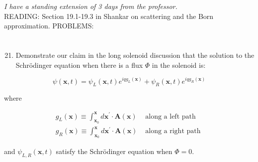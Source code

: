 \documentclass[12pt]{article}
\begin{document}
\emph{I have a standing extension of 3 days from the professor.}\\
READING: Section 19.1-19.3 in Shankar on scattering and the Born approximation. PROBLEMS:
\section{}
\begin{enumerate}
  \setcounter{enumi}{20}
  \item Demonstrate our claim in the long solenoid discussion that the solution to the Schrödinger equation when there is a flux $\Phi$ in the solenoid is:
\end{enumerate}

$$
\psi(\mathbf{x}, t)=\psi_{L}(\mathbf{x}, t) e^{i q g_{L}(\mathbf{x})}+\psi_{R}(\mathbf{x}, t) e^{i q g_{R}(\mathbf{x})}
$$

where

$$
\begin{array}{ll}
g_{L}(\mathbf{x}) \equiv \int_{\mathbf{x}_{0}}^{\mathbf{x}} d \mathbf{x}^{\prime} \cdot \mathbf{A}(\mathbf{x}) & \text { along a left path } \\
g_{R}(\mathbf{x}) \equiv \int_{\mathbf{x}_{0}}^{\mathbf{x}} d \mathbf{x}^{\prime} \cdot \mathbf{A}(\mathbf{x}) & \text { along a right path }
\end{array}
$$

and $\psi_{L, R}(\mathbf{x}, t)$ satisfy the Schrödinger equation when $\Phi=0$.
\end{document}
